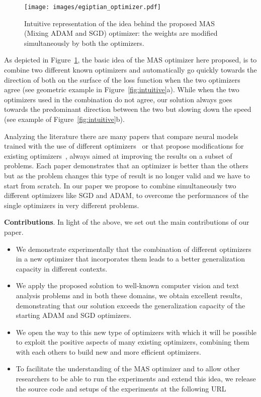 \documentclass[10pt,twocolumn,letterpaper]{article}
\begin{document}
\begin{figure}
    \centering
    \texttt{[image: images/egiptian\_optimizer.pdf]}
    \caption{Intuitive representation of the idea behind the proposed MAS (Mixing ADAM and SGD) optimizer: the weights are modified simultaneously by both the optimizers.}
    \label{fig:proposed}
\end{figure}

As depicted in Figure~\ref{fig:proposed}, the basic idea of the MAS optimizer here proposed, is to combine two different known optimizers and automatically go quickly towards the direction of both on the surface of the loss function when the two optimizers agree (see geometric example in Figure~\ref{fig:intuitive}a). While when the two optimizers used in the combination do not agree, our solution always goes towards the predominant direction between the two but slowing down the speed (see example of Figure~\ref{fig:intuitive}b).


Analyzing the literature there are many papers that compare neural models trained with the use of different optimizers~\cite{bera2020analysis,graves2013generating,duchi2011adaptive,zeiler2012adadelta} or that propose modifications for existing optimizers~\cite{luo2018adaptive,kobayashi2020scw,zhang2018improved}, always aimed at improving the results on a subset of problems.
Each paper demonstrates that an optimizer is better than the others but as the problem changes this type of result is no longer valid and we have to start from scratch.
In our paper we propose to combine simultaneously two different optimizers like SGD and ADAM, to overcome the performances of the single optimizers in very different problems.



\textbf{Contributions}.
In light of the above, we set out the main contributions of our paper.
\begin{itemize}
    \item We demonstrate experimentally that the combination of different optimizers in a new optimizer that incorporates them leads to a better generalization capacity in different contexts.
    \item We apply the proposed solution to well-known computer vision and text analysis problems and in both these domains, we obtain excellent results, demonstrating that our solution exceeds the generalization capacity of the starting ADAM and SGD optimizers.
    \item We open the way to this new type of optimizers with which it will be possible to exploit the positive aspects of many existing optimizers, combining them with each others to build new and more efficient optimizers.
    \item To facilitate the understanding of the MAS optimizer and to allow other researchers to be able to run the experiments and extend this idea, we release the source code and setups of the experiments at the following URL~\cite{torch_code}
\end{itemize}
\end{document}
